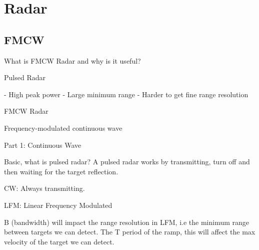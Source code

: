 \documentclass[11pt]{article}
\begin{document}
\section{Radar}

\subsection{FMCW}

What is FMCW Radar and why is it useful?\cite{marshallfmcw}

Pulsed Radar

  - High peak power
  - Large minimum range
  - Harder to get fine range resolution

FMCW Radar

Frequency-modulated continuous wave

Part 1: Continuous Wave

Basic, what is pulsed radar? A pulsed radar works by transmitting, turn off and
then waiting for the target reflection.

CW: Always transmitting.

LFM: Linear Frequency Modulated

B (bandwidth) will impact the range resolution in LFM, i.e the minimum range
between targets we can detect. The T period of the ramp, this will affect the
max velocity of the target we can detect.

\newpage
\printbibliography
\end{document}
